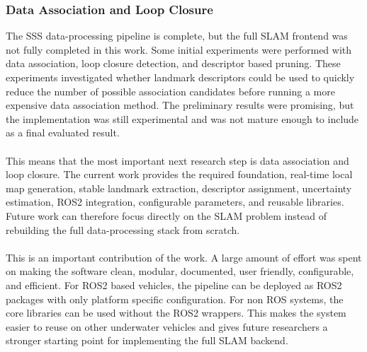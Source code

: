 \subsubsection{Data Association and Loop Closure}
The SSS data-processing pipeline is complete, but the full SLAM frontend was not fully completed in this work. Some initial experiments were performed with data association, loop closure detection, and descriptor based pruning. These experiments investigated whether landmark descriptors could be used to quickly reduce the number of possible association candidates before running a more expensive data association method. The preliminary results were promising, but the implementation was still experimental and was not mature enough to include as a final evaluated result.
\\ \\
This means that the most important next research step is data association and loop closure. The current work provides the required foundation, real-time local map generation, stable landmark extraction, descriptor assignment, uncertainty estimation, ROS2 integration, configurable parameters, and reusable libraries. Future work can therefore focus directly on the SLAM problem instead of rebuilding the full data-processing stack from scratch.
\\ \\
This is an important contribution of the work. A large amount of effort was spent on making the software clean, modular, documented, user friendly, configurable, and efficient. For ROS2 based vehicles, the pipeline can be deployed as ROS2 packages with only platform specific configuration. For non ROS systems, the core libraries can be used without the ROS2 wrappers. This makes the system easier to reuse on other underwater vehicles and gives future researchers a stronger starting point for implementing the full SLAM backend.

